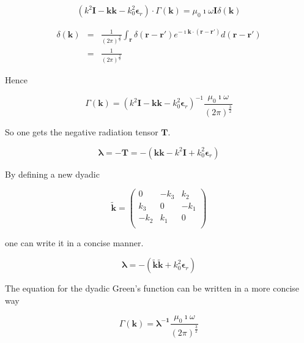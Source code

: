 \documentclass[a4paper,11pt]{thesis}
\begin{document}
\begin{equation}
     \left(   k^2 \mathbf{I} -  \mathbf{kk} - k_0^2 \mathbf{\epsilon}_r\right) \cdot \Gamma(\mathbf{k}) = \mu_0 \imath \omega \mathbf{I}  \delta (\mathbf{k})
\end{equation}

\begin{eqnarray}
    \delta (\mathbf{k})&=& \frac{1}{(2\pi )^{\frac{3}{2}}} \int_{\mathbf{r}} \delta (\mathbf{r}-\mathbf{r'}) e^{-\imath \mathbf{k} \cdot (\mathbf{r}-\mathbf{r'})} d(\mathbf{r}-\mathbf{r'})\\
&=&\frac{1}{(2\pi )^{\frac{3}{2}}}
\end{eqnarray}

Hence

\begin{equation}
    \Gamma(\mathbf{k}) =\left(  k^2 \mathbf{I} - \mathbf{kk} -  k_0^2 \mathbf{\epsilon}_r\right)^{-1} \frac{\mu_0 \imath \omega }{(2\pi )^{\frac{3}{2}}}
\end{equation}

So one gets the negative radiation tensor $\mathbf{T}$.

\begin{equation}\label{eq:rel_t_lambda}
    \mathbf{\lambda}=-\mathbf{T}=-\left( \mathbf{kk} - k^2 \mathbf{I} +   k_0^2 \mathbf{\epsilon}_r\right)
\end{equation}

By defining a new dyadic

\begin{equation}
    \mathbf{\tilde{k}}=\left(%
\begin{array}{ccc}
  0 & -k_3 & k_2 \\
k_3 & 0 & -k_1 \\
-k_2 & k_1 & 0 \\\end{array}%
\right)
\end{equation}

one can write it in a concise manner.

\begin{equation}
    \mathbf{\lambda}=-\left( \mathbf{\tilde{k}\tilde{k}} +  k_0^2 \mathbf{\epsilon}_r\right)
\end{equation}

The equation for the dyadic Green's function can be written in a more concise way

\begin{equation}
    \Gamma(\mathbf{k}) =\mathbf{\lambda^{-1} }\frac{\mu_0 \imath \omega }{(2\pi )^{\frac{3}{2}}}
\end{equation}
\end{document}
